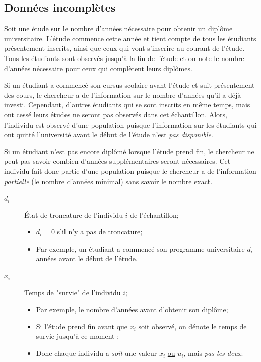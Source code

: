 \documentclass[french]{article}
\begin{document}
\begin{multicols*}{2}
\columnbreak
\subsection{Données incomplètes}
\begin{rappel_enhanced}[Exemple]
Soit une étude sur le nombre d'années nécessaire pour obtenir un diplôme universitaire. L'étude commence cette année et tient compte de tous les étudiants présentement inscrits, ainsi que ceux qui vont s'inscrire au courant de l'étude. Tous les étudiants sont observés jusqu'à la fin de l'étude et on note le nombre d'années nécessaire pour ceux qui complètent leurs diplômes. 

\bigskip

Si un étudiant a commencé son cursus scolaire avant l'étude et suit présentement des cours, le chercheur a de l'information sur le nombre d'années qu'il a déjà investi. Cependant, d'autres étudiants qui se sont inscrits en même temps, mais ont cessé leurs études ne seront pas observés dans cet échantillon. Alors, l'individu est observé d'une population  puisque l'information sur les étudiants qui ont quitté l'université avant le début de l'étude n'est \textit{pas disponible}.

\bigskip

Si un étudiant n'est pas encore diplômé lorsque l'étude prend fin, le chercheur ne peut pas savoir combien d'années supplémentaires seront nécessaires. Cet individu fait donc partie d'une population  puisque le chercheur a de l'information \textit{partielle} (le nombre d'années minimal) sans savoir le nombre exact.
\end{rappel_enhanced}

\begin{distributions}[Notation]
\begin{description}
	\item[$d_{i}$]	État de troncature de l'individu $i$ de l'échantillon;
		\begin{itemize}[leftmargin = *]
		\item	$d_{i}	=	0$ s'il n'y a pas de troncature;
		\item	Par exemple, un étudiant a commencé son programme universitaire $d_{i}$ années avant le début de l'étude.
		\end{itemize}
	\item[$x_{i}$]	Temps de "survie" de l'individu $i$;
		\begin{itemize}[leftmargin = *]
		\item	Par exemple, le nombre d'années avant d'obtenir son diplôme;
		\item	Si l'étude prend fin avant que $x_{i}$ soit observé, on dénote le temps de survie jusqu'à ce moment ;
		\item	Donc chaque individu a \textit{soit} une valeur $x_{i}$ \underline{ou} $u_{i}$, mais \textit{pas les deux}.
		\end{itemize}
\end{description}
\end{distributions}




\end{multicols*}
\end{document}

